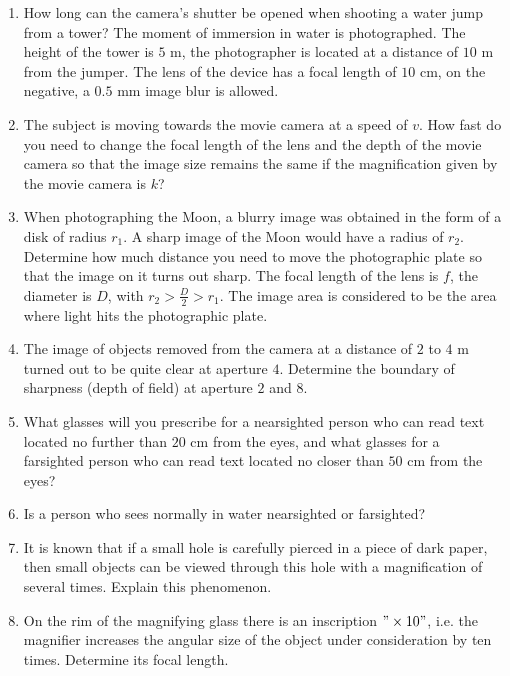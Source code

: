 \documentclass{article}
\begin{document}
\begin{enumerate}[label=13.3.\arabic*]
\item How long can the camera's shutter be opened when shooting a water jump from a tower? The moment of immersion in water is photographed. The height of the tower is $5$ m, the photographer is located at a distance of $10$ m from the jumper. The lens of the device has a focal length of $10$ cm, on the negative, a $0.5$ mm image blur is allowed.

\item The subject is moving towards the movie camera at a speed of $v$. How fast do you need to change the focal length of the lens and the depth of the movie camera so that the image size remains the same if the magnification given by the movie camera is $k$?

\item When photographing the Moon, a blurry image was obtained in the form of a disk of radius $r_1$. A sharp image of the Moon would have a radius of $r_2$. Determine how much distance you need to move the photographic plate so that the image on it turns out sharp. The focal length of the lens is $f$, the diameter is $D$, with $r_2 > \frac{D}{2} > r_1$. The image area is considered to be the area where light hits the photographic plate.

\item The image of objects removed from the camera at a distance of $2$ to $4$ m turned out to be quite clear at aperture $4$. Determine the boundary of sharpness (depth of field) at aperture $2$ and $8$.

\item What glasses will you prescribe for a nearsighted person who can read text located no further than $20$ cm from the eyes, and what glasses for a farsighted person who can read text located no closer than $50$ cm from the eyes?

\item Is a person who sees normally in water nearsighted or farsighted?

\item It is known that if a small hole is carefully pierced in a piece of dark paper, then small objects can be viewed through this hole with a magnification of several times. Explain this phenomenon.

\item On the rim of the magnifying glass there is an inscription $"\times 10"$, i.e. the magnifier increases the angular size of the object under consideration by ten times. Determine its focal length.


\end{enumerate}
\end{document}
